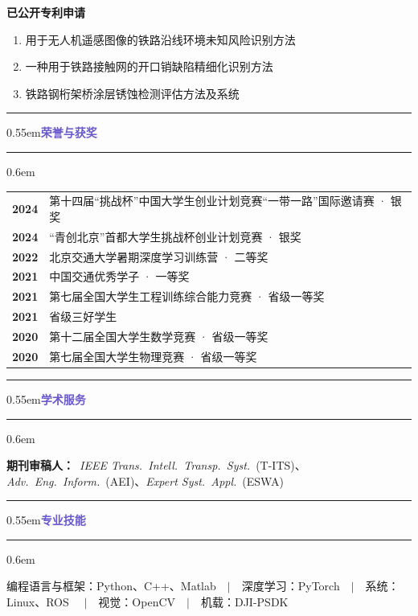 \documentclass[10.5pt,a4paper]{ctexart}
\newcommand{\secbar}{\textcolor{hairdk}{\rule[0.35ex]{0.12em}{1.35em}}}
\newcommand{\cvsec}[1]{{%
  \par\noindent\nopagebreak\medskip
  \secbar\kern0.55em\textcolor{slateblue}{\sffamily\bfseries\large #1}\par\nopagebreak
  \noindent\textcolor{hair}{\rule[0.2em]{\textwidth}{0.55pt}}\par\nopagebreak
  \kern0.6em
}}
\newcommand{\greyyear}[1]{\textcolor{muted}{\sffamily\bfseries #1}}
\begin{document}
\vspace{0.3em}\noindent\textbf{已公开专利申请}\par
\vspace{0.2em}
\begin{enumerate}[leftmargin=1.7em,itemsep=2pt,labelsep=0.5em,resume]
  \item 用于无人机遥感图像的铁路沿线环境未知风险识别方法
  \item 一种用于铁路接触网的开口销缺陷精细化识别方法
  \item 铁路钢桁架桥涂层锈蚀检测评估方法及系统
\end{enumerate}

\cvsec{荣誉与获奖}

\begin{tabular}{@{}ll@{}}
\greyyear{2024} & 第十四届“挑战杯”中国大学生创业计划竞赛“一带一路”国际邀请赛 · 银奖\\[1.2pt]
\greyyear{2024} & “青创北京”首都大学生挑战杯创业计划竞赛 · 银奖\\[1.2pt]
\greyyear{2022} & 北京交通大学暑期深度学习训练营 · 二等奖\\[1.2pt]
\greyyear{2021} & 中国交通优秀学子 · 一等奖\\[1.2pt]
\greyyear{2021} & 第七届全国大学生工程训练综合能力竞赛 · 省级一等奖\\[1.2pt]
\greyyear{2021} & 省级三好学生\\[1.2pt]
\greyyear{2020} & 第十二届全国大学生数学竞赛 · 省级一等奖\\[1.2pt]
\greyyear{2020} & 第七届全国大学生物理竞赛 · 省级一等奖\\
\end{tabular}

\cvsec{学术服务}

\noindent\textbf{期刊审稿人：}\ \textit{IEEE Trans.\ Intell.\ Transp.\ Syst.}~(T-ITS)、\textit{Adv.\ Eng.\ Inform.}~(AEI)、\textit{Expert Syst.\ Appl.}~(ESWA)

\cvsec{专业技能}

\noindent
编程语言与框架：Python、C++、Matlab\ \ $|$\ \ 深度学习：PyTorch\ \ $|$\ \ 系统：Linux、ROS
\ \ $|$\ \ 视觉：OpenCV\ \ $|$\ \ 机载：DJI-PSDK
\end{document}
